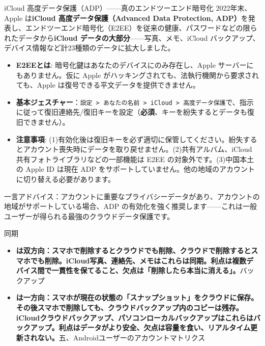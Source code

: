\begin{tcbwarn}{iCloud 高度データ保護（ADP）——真のエンドツーエンド暗号化}
2022年末、Apple は\textbf{iCloud 高度データ保護（Advanced Data Protection, ADP）}を発表し、エンドツーエンド暗号化（E2EE）を従来の健康、パスワードなどの限られたデータから\textbf{iCloud データの大部分}——写真、メモ、iCloud バックアップ、デバイス情報など計23種類のデータに拡大しました。

\begin{itemize}
  \item \textbf{E2EEとは}: 暗号化鍵はあなたのデバイスにのみ存在し、Apple サーバーにもありません。仮に Apple がハッキングされても、法執行機関から要求されても、Apple は復号できる平文データを提供できません。
  \item \textbf{基本ジェスチャー}：\texttt{設定 > あなたの名前 > iCloud > 高度データ保護}で、指示に従って復旧連絡先/復旧キーを設定（\textbf{必須}、キーを紛失するとデータも復旧できません）。
  \item \textbf{注意事項}: (1)有効化後は復旧キーを必ず適切に保管してください。紛失するとアカウント喪失時にデータを取り戻せません。(2)共有アルバム、iCloud 共有フォトライブラリなどの一部機能は E2EE の対象外です。(3)中国本土の Apple ID は現在 ADP をサポートしていません。他の地域のアカウントに切り替える必要があります。
\end{itemize}

一言アドバイス：アカウントに重要なプライバシーデータがあり、アカウントの地域がサポートしている場合、ADP の有効化を強く推奨します——これは一般ユーザーが得られる最強のクラウドデータ保護です。

\end{tcbwarn}


同期

\begin{itemize}
  \item \textbf{は双方向：スマホで削除するとクラウドでも削除、クラウドで削除するとスマホでも削除。iCloud写真、連絡先、メモはこれらは同期。利点は複数デバイス間で一貫性を保てること、欠点は「削除したら本当に消える」。}バックアップ
  \item \textbf{は一方向：スマホが現在の状態の「スナップショット」をクラウドに保存。その後スマホで削除しても、クラウドバックアップ内のコピーは残存。iCloudクラウドバックアップ、パソコンローカルバックアップはこれらはバックアップ。利点はデータがより安全、欠点は容量を食い、リアルタイム更新されない。}五、Androidユーザーのアカウントマトリクス
\end{itemize}

